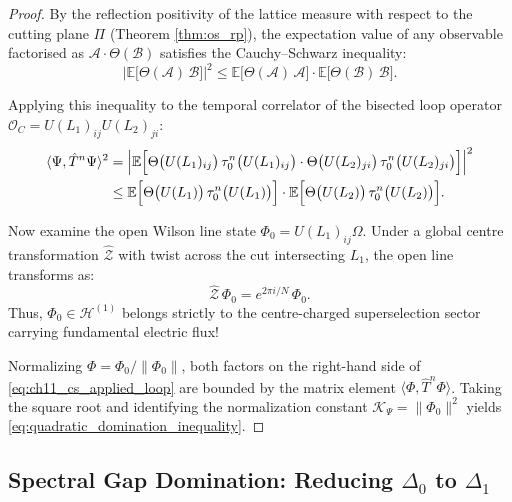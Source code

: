 \begin{proof}
By the reflection positivity of the lattice measure with respect to the cutting plane $\Pi$ (Theorem \ref{thm:os_rp}), the expectation value of any observable factorised as $\mathcal{A} \cdot \Theta(\mathcal{B})$ satisfies the Cauchy--Schwarz inequality:
\begin{equation}
\label{eq:ch11_cs_rp}
\bigl| \mathbb{E}\bigl[ \Theta(\mathcal{A}) \, \mathcal{B} \bigr] \bigr|^2 \le \mathbb{E}\bigl[ \Theta(\mathcal{A}) \, \mathcal{A} \bigr] \cdot \mathbb{E}\bigl[ \Theta(\mathcal{B}) \, \mathcal{B} \bigr].
\end{equation}

Applying this inequality to the temporal correlator of the bisected loop operator $\mathcal{O}_C = U(L_1)_{ij} U(L_2)_{ji}$:
\begin{align}
\label{eq:ch11_cs_applied_loop}
\langle \Psi, \hat{T}^n \Psi \rangle^2 &= \Bigl| \mathbb{E}\Bigl[ \Theta\bigl( U(L_1)_{ij} \bigr) \, \tau_0^n\bigl( U(L_1)_{ij} \bigr) \cdot \Theta\bigl( U(L_2)_{ji} \bigr) \, \tau_0^n\bigl( U(L_2)_{ji} \bigr) \Bigr] \Bigr|^2 \nonumber \\
&\le \mathbb{E}\Bigl[ \Theta\bigl( U(L_1) \bigr) \, \tau_0^n\bigl( U(L_1) \bigr) \Bigr] \cdot \mathbb{E}\Bigl[ \Theta\bigl( U(L_2) \bigr) \, \tau_0^n\bigl( U(L_2) \bigr) \Bigr].
\end{align}

Now examine the open Wilson line state $\Phi_0 = U(L_1)_{ij} \Omega$. Under a global centre transformation $\hat{\mathcal{Z}}$ with twist across the cut intersecting $L_1$, the open line transforms as:
\begin{equation}
\hat{\mathcal{Z}} \, \Phi_0 = e^{2\pi i / N} \, \Phi_0.
\end{equation}
Thus, $\Phi_0 \in \mathcal{H}^{(1)}$ belongs strictly to the centre-charged superselection sector carrying fundamental electric flux!

Normalizing $\Phi = \Phi_0 / \|\Phi_0\|$, both factors on the right-hand side of \eqref{eq:ch11_cs_applied_loop} are bounded by the matrix element $\langle \Phi, \hat{T}^n \Phi \rangle$. Taking the square root and identifying the normalization constant $\mathcal{K}_\Psi = \|\Phi_0\|^2$ yields \eqref{eq:quadratic_domination_inequality}.
\end{proof}

\subsection{Spectral Gap Domination: Reducing \texorpdfstring{$\Delta_0$}{Delta_0} to \texorpdfstring{$\Delta_1$}{Delta_1}}
\label{subsec:spectral_gap_domination}

